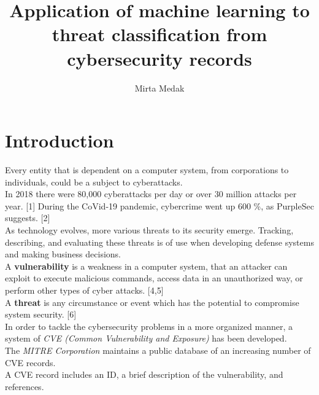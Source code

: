 \documentclass[times, utf8, zavrsni, english]{fer}
\begin{document}

\title{Application of machine learning to threat classification from cybersecurity records}

\author{Mirta Medak}

\maketitle

\izvornik

\zahvala{}

\tableofcontents

\chapter{Introduction}
Every entity that is dependent on a computer system, from corporations to individuals, could be a subject to cyberattacks. \\
In 2018 there were 80,000 cyberattacks per day or over 30 million attacks per year. [1] During the CoVid-19 pandemic, cybercrime went up 600 \%, as PurpleSec suggests. [2] \\
As technology evolves, more various threats to its security emerge.
Tracking, describing, and evaluating these threats is of use when developing defense systems and making business decisions. \\

A \textbf{vulnerability} is a weakness in a computer system, that an attacker can exploit to execute malicious commands, access data in an unauthorized way, or perform other types of cyber attacks. [4,5] \\
A \textbf{threat} is any circumstance or event which has the potential to compromise system security. [6] \\
In order to tackle the cybersecurity problems in a more organized manner, a system of \emph{CVE (Common Vulnerability and Exposure)} has been developed. \\
The \emph{MITRE Corporation} maintains a public database of an increasing number of CVE records. \\
A CVE record includes an ID, a brief description of the vulnerability, and references.
\end{document}
